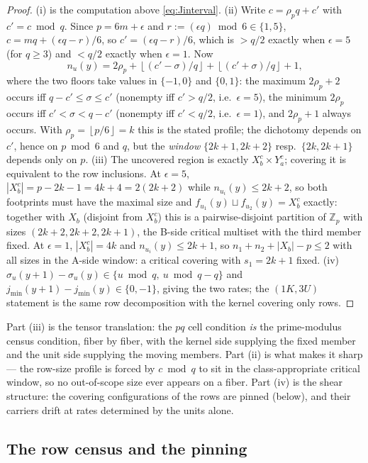 \documentclass[11pt,a4paper]{article}
\numberwithin{equation}{section}
\theoremstyle{plain}
\theoremstyle{definition}
\theoremstyle{remark}
\newcommand{\Z}{\mathbb{Z}}
\newcommand{\floor}[1]{\left\lfloor #1 \right\rfloor}
\begin{document}
\begin{proof}
(i) is the computation above \eqref{eq:Jinterval}. (ii) Write
$c=\rho_p q+c'$ with $c'=c\bmod q$. Since $p=6m+\epsilon$ and
$r:=(\epsilon q)\bmod 6\in\{1,5\}$,
$c=mq+(\epsilon q-r)/6$, so $c'=(\epsilon q-r)/6$, which is $>q/2$ exactly
when $\epsilon=5$ (for $q\ge 3$) and $<q/2$ exactly when $\epsilon=1$. Now
\[
n_u(y)=2\rho_p+\floor{(c'-\sigma)/q}+\floor{(c'+\sigma)/q}+1,
\]
where the two floors take values in $\{-1,0\}$ and $\{0,1\}$: the maximum
$2\rho_p+2$ occurs iff $q-c'\le\sigma\le c'$ (nonempty iff $c'>q/2$, i.e.\
$\epsilon=5$), the minimum $2\rho_p$ occurs iff
$c'<\sigma<q-c'$ (nonempty iff $c'<q/2$, i.e.\ $\epsilon=1$), and
$2\rho_p+1$ always occurs. With $\rho_p=\floor{p/6}=k$ this is the stated
profile; the dichotomy depends on $c'$, hence on $p\bmod 6$ and $q$, but the
\emph{window} $\{2k{+}1,2k{+}2\}$ resp.\ $\{2k,2k{+}1\}$ depends only on
$p$. (iii) The uncovered region is exactly $X_b^c\times Y_a^c$; covering it
is equivalent to the row inclusions. At $\epsilon=5$,
$|X_b^{c}|=p-2k-1=4k+4=2(2k+2)$ while $n_{u_i}(y)\le 2k+2$, so both
footprints must have the maximal size and
$f_{u_1}(y)\sqcup f_{u_2}(y)=X_b^{c}$ exactly: together with $X_b$ (disjoint
from $X_b^{c}$) this is a pairwise-disjoint partition of $\Z_p$ with sizes
$(2k+2,2k+2,2k+1)$, the B-side critical multiset with the third member fixed.
At $\epsilon=1$, $|X_b^{c}|=4k$ and $n_{u_i}(y)\le 2k+1$, so
$n_1+n_2+|X_b|-p\le 2$ with all sizes in the A-side window: a critical
covering with $s_1=2k+1$ fixed. (iv) $\sigma_u(y{+}1)-\sigma_u(y)\in\{u
\bmod q,\ u\bmod q-q\}$ and $j_{\min}(y{+}1)-j_{\min}(y)\in\{0,-1\}$, giving
the two rates; the $(1K,3U)$ statement is the same row decomposition with the
kernel covering only rows.
\end{proof}

Part (iii) is the tensor translation: the $pq$ cell condition \emph{is} the
prime-modulus census condition, fiber by fiber, with the kernel side
supplying the fixed member and the unit side supplying the moving members.
Part (ii) is what makes it sharp --- the row-size profile is forced by
$c\bmod q$ to sit in the class-appropriate critical window, so no
out-of-scope size ever appears on a fiber. Part (iv) is the shear structure:
the covering configurations of the rows are pinned (below), and their
carriers drift at rates determined by the units alone.

\subsection{The row census and the pinning}\label{sec:pq-census}
\end{document}
